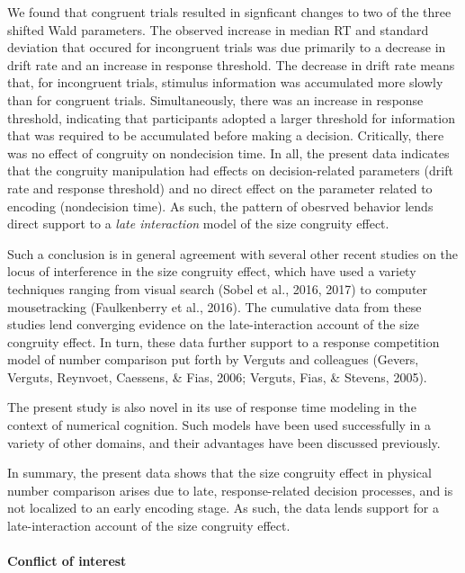 \documentclass[english,man]{apa6}
\theoremstyle{definition}
\theoremstyle{definition}
\theoremstyle{definition}
\theoremstyle{remark}
\begin{document}
We found that congruent trials resulted in signficant changes to two of
the three shifted Wald parameters. The observed increase in median RT
and standard deviation that occured for incongruent trials was due
primarily to a decrease in drift rate and an increase in response
threshold. The decrease in drift rate means that, for incongruent
trials, stimulus information was accumulated more slowly than for
congruent trials. Simultaneously, there was an increase in response
threshold, indicating that participants adopted a larger threshold for
information that was required to be accumulated before making a
decision. Critically, there was no effect of congruity on nondecision
time. In all, the present data indicates that the congruity manipulation
had effects on decision-related parameters (drift rate and response
threshold) and no direct effect on the parameter related to encoding
(nondecision time). As such, the pattern of obesrved behavior lends
direct support to a \emph{late interaction} model of the size congruity
effect.

Such a conclusion is in general agreement with several other recent
studies on the locus of interference in the size congruity effect, which
have used a variety techniques ranging from visual search (Sobel et al.,
2016, 2017) to computer mousetracking (Faulkenberry et al., 2016). The
cumulative data from these studies lend converging evidence on the
late-interaction account of the size congruity effect. In turn, these
data further support to a response competition model of number
comparison put forth by Verguts and colleagues (Gevers, Verguts,
Reynvoet, Caessens, \& Fias, 2006; Verguts, Fias, \& Stevens, 2005).

The present study is also novel in its use of response time modeling in
the context of numerical cognition. Such models have been used
successfully in a variety of other domains, and their advantages have
been discussed previously.

In summary, the present data shows that the size congruity effect in
physical number comparison arises due to late, response-related decision
processes, and is not localized to an early encoding stage. As such, the
data lends support for a late-interaction account of the size congruity
effect.

\paragraph{Conflict of interest}\label{conflict-of-interest}
\end{document}
